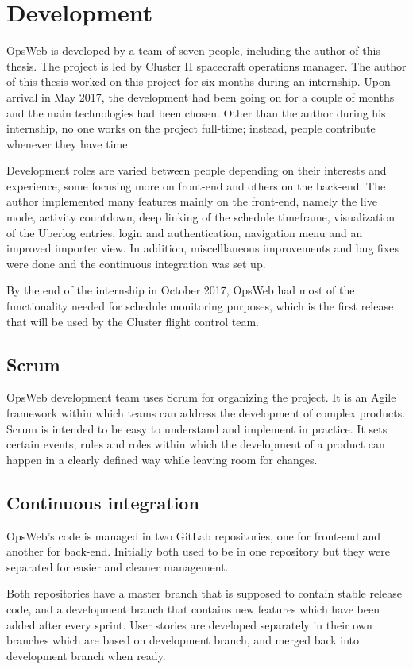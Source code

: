 \section{Development}
OpsWeb is developed by a team of seven people, including the author of this thesis. The project is led by Cluster II spacecraft operations manager. The author of this thesis worked on this project for six months during an internship. Upon arrival in May 2017, the development had been going on for a couple of months and the main technologies had been chosen. Other than the author during his internship, no one works on the project full-time; instead, people contribute whenever they have time.

Development roles are varied between people depending on their interests and experience, some focusing more on front-end and others on the back-end. The author implemented many features mainly on the front-end, namely the live mode, activity countdown, deep linking of the schedule timeframe, visualization of the Uberlog entries, login and authentication, navigation menu and an improved importer view. In addition, miscelllaneous improvements and bug fixes were done and the continuous integration was set up.

By the end of the internship in October 2017, OpsWeb had most of the functionality needed for schedule monitoring purposes, which is the first release that will be used by the Cluster flight control team.
\subsection{Scrum}
OpsWeb development team uses Scrum for organizing the project. It is an Agile framework within which teams can address the development of complex products. Scrum is intended to be easy to understand and implement in practice. It sets certain events, rules and roles within which the development of a product can happen in a clearly defined way while leaving room for changes. \cite{beck2001manifesto} \cite{scrum}
\subsection{Continuous integration}
OpsWeb's code is managed in two GitLab repositories, one for front-end and another for back-end. Initially both used to be in one repository but they were separated for easier and cleaner management.

Both repositories have a master branch that is supposed to contain stable release code, and a development branch that contains new features which have been added after every sprint. User stories are developed separately in their own branches which are based on development branch, and merged back into development branch when ready.

